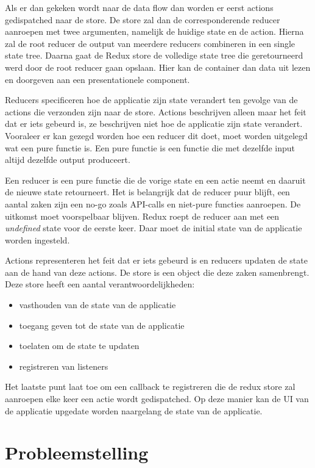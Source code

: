 Als er dan gekeken wordt naar de data flow dan worden er eerst actions gedispatched naar de store. De store zal dan de corresponderende reducer aanroepen met twee argumenten, namelijk de huidige state en de action. Hierna zal de root reducer de output van meerdere reducers combineren in een single state tree. Daarna gaat de Redux store de volledige state tree die geretourneerd werd door de root reducer gaan opslaan. Hier kan de container dan data uit lezen en doorgeven aan een presentationele component.

Reducers specificeren hoe de applicatie zijn state verandert ten gevolge van de actions die verzonden zijn naar de store. Actions beschrijven alleen maar het feit dat er iets gebeurd is, ze beschrijven niet hoe de applicatie zijn state verandert.
Vooraleer er kan gezegd worden hoe een reducer dit doet, moet worden uitgelegd wat een pure functie is. Een pure functie is een functie die met dezelfde input altijd dezelfde output produceert. \autocite{Pure01}

Een reducer is een pure functie die de vorige state en een actie neemt en daaruit de nieuwe state retourneert. Het is belangrijk dat de reducer puur blijft, een aantal zaken zijn een no-go zoals API-calls en niet-pure functies aanroepen. De uitkomst moet voorspelbaar blijven. Redux roept de reducer aan met een \textit{undefined} state voor de eerste keer. Daar moet de initial state van de applicatie worden ingesteld. \autocite{Redux02}

Actions representeren het feit dat er iets gebeurd is en reducers updaten de state aan de hand van deze actions. De store is een object die deze zaken samenbrengt. Deze store heeft een aantal verantwoordelijkheden: 
\begin{itemize}
	\item vasthouden van de state van de applicatie
	\item toegang geven tot de state van de applicatie
	\item toelaten om de state te updaten
	\item registreren van listeners
\end{itemize}
Het laatste punt laat toe om een callback te registreren die de redux store zal aanroepen elke keer een actie wordt gedispatched. Op deze manier kan de UI van de applicatie upgedate worden naargelang de state van de applicatie. 



\section{Probleemstelling}
\label{sec:probleemstelling}

